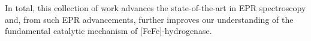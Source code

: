 In total, this collection of work advances the state-of-the-art in EPR spectroscopy and, from such EPR advancements, further improves our understanding of the fundamental catalytic mechanism of [FeFe]-hydrogenase. 



{\renewcommand{\bibsection}{\clearpage\section*{\bibname}\markboth{\bibname}{\bibname}}
\renewcommand{\bibname}{CHAPTER 1. REFERENCES}


}